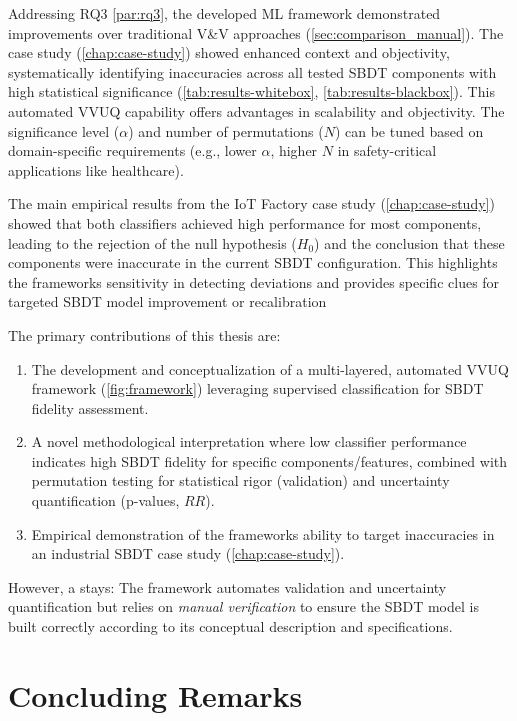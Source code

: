 Addressing RQ3 \autoref{par:rq3}, the developed ML framework demonstrated improvements over traditional V\&V approaches (\autoref{sec:comparison_manual}). The case study (\autoref{chap:case-study}) showed enhanced context and objectivity, systematically identifying inaccuracies across all tested SBDT components with high statistical significance (\autoref{tab:results-whitebox}, \autoref{tab:results-blackbox}). This automated VVUQ capability offers advantages in scalability and objectivity. The significance level ($\alpha$) and number of permutations ($N$) can be tuned based on domain-specific requirements (e.g., lower $\alpha$, higher $N$ in safety-critical applications like healthcare).

The main empirical results from the IoT Factory case study (\autoref{chap:case-study}) showed that both classifiers achieved high performance for most components, leading to the rejection of the null hypothesis ($H_0$) and the conclusion that these components were inaccurate in the current SBDT configuration. This highlights the frameworks sensitivity in detecting deviations and provides specific clues for targeted SBDT model improvement or recalibration

The primary contributions of this thesis are:
\begin{enumerate}
  \item The development and conceptualization of a multi-layered, automated VVUQ framework (\autoref{fig:framework}) leveraging supervised classification for SBDT fidelity assessment.
  \item A novel methodological interpretation where low classifier performance indicates high SBDT fidelity for specific components/features, combined with permutation testing for statistical rigor (validation) and uncertainty quantification (p-values, $RR$).
  \item Empirical demonstration of the frameworks ability to target inaccuracies in an industrial SBDT case study (\autoref{chap:case-study}).
\end{enumerate}

However, a  stays: The framework automates validation and uncertainty quantification but relies on \textit{manual verification} to ensure the SBDT model is built correctly according to its conceptual description and specifications.

\section{Concluding Remarks}
\label{sec:conclusion_remarks}

